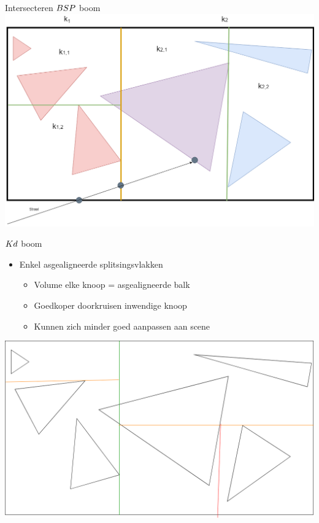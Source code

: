 \documentclass[11pt,t]{beamer}
\begin{document}
\begin{frame}[c]{Intersecteren $BSP$ boom}
	\includegraphics[width=0.8\paperwidth]{../img/volumeSplitTraversal}
\end{frame}

\begin{frame}{$Kd$ boom}
	\begin{itemize}
	\item Enkel asgealigneerde splitsingsvlakken
		\begin{itemize}
			\item Volume elke knoop = asgealigneerde balk
			\item Goedkoper doorkruisen inwendige knoop
			\item Kunnen zich minder goed aanpassen aan scene
		\end{itemize}
	\end{itemize}
	\vspace{5pt}
	\hspace{5pt}
	\includegraphics[height=0.5\paperheight]{../img/splitsing-Kd}

\end{frame}
\end{document}
